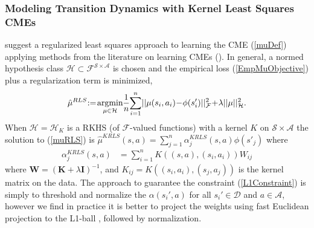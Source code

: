 \documentclass[letterpaper]{article}
\newcommand{\GrunewalderEmbeddingsRL}{GrunewalderEmbeddingsMDP}
\newcommand{\GrunewalderEmbeddingsRegression}{GrunewalderEmbeddingsRegression}
\newcommand{\SongNonparametric}{DBLP:journals/jmlr/SongGG10}
\newcommand{\DuchiProjections}{DBLP:conf/icml/DuchiSSC08}
\newcommand{\cD}{{\mathcal D}}
\newcommand{\cH}{{\mathcal H}}
\newcommand{\cF}{{\mathcal F}}
\newcommand{\cA}{{\mathcal A}}
\newcommand{\cS}{{\mathcal S}}
\newcommand{\balpha}{{\bm \alpha}}
\newcommand{\bbeta}{{\bm \beta}}
\newcommand{\bK}{{\bm K}}
\newcommand{\bW}{{\bm W}}
\newcommand{\bI}{{\bm I}}
\newcommand{\E}{{\mathbb E}}
\newcommand{\R}{{\mathbb R}}
\newcommand{\argmin}{\operatornamewithlimits{argmin}}
\newcommand{\nn}{\nonumber}
\begin{document}
\subsubsection{Modeling Transition Dynamics with Kernel Least Squares CMEs}

\cite{\GrunewalderEmbeddingsRL} suggest a regularized least squares approach to learning the CME (\ref{muDef}) applying methods from the literature on learning CMEs (\cite{\SongNonparametric,\GrunewalderEmbeddingsRegression}). In general, a normed hypothesis class $\cH\subset \cF^{\cS\times\cA}$ is chosen and the empirical loss (\ref{EmpMuObjective}) plus a regularization term is minimized,
\begin{align}
\hat\mu^{RLS}\hspace{-0.9mm} := \hspace{-0.6mm}\argmin_{\mu\in\cH}  \hspace{-0.7mm}\frac{1}{n}\hspace{-0.7mm}\sum_{i=1}^n\hspace{-0.6mm} || \mu (s_i,a_i) \hspace{-0.7mm}-\hspace{-0.7mm} \phi(s'_i) ||_\cF^2 \hspace{-0.7mm}+\hspace{-0.7mm}\lambda ||\mu||^2_{\cH} . \label{muRLS}
\end{align}
When $\cH=\cH_K$ is a RKHS (of $\cF$-valued functions) with a kernel $K$ on $\cS\times\cA$ the solution to (\ref{muRLS}) is $\hat\mu^{KRLS}(s,a) = \sum_{j=1}^n \alpha_j^{KRLS}(s,a) \phi(s'_j)$ where
\begin{align}
\alpha_j^{KRLS}(s,a) &=  \sum_{i=1}^n K((s,a),(s_i,a_i)) W_{ij}  \label{KRLSalphas}
\end{align}
where $\bW = (\bK + \lambda \bI)^{-1}$, and $K_{ij} = K((s_i,a_i),(s_j,a_j))$ is the kernel matrix on the data. The approach to guarantee the constraint (\ref{L1Constraint}) is simply to threshold and normalize the $\alpha(s_i',a)$ for all $s_i'\in\cD$ and $a\in\cA$, however we find in practice it is better to project the weights using fast Euclidean projection to the L1-ball \citep[e.g.][]{\DuchiProjections}, followed by normalization.%
\end{document}
